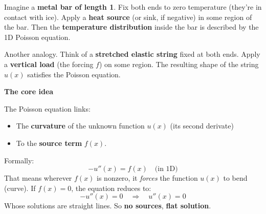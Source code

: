 \highspace
\begin{examplebox}
    Imagine a \textbf{metal bar of length 1}. Fix both ends to zero temperature (they're in contact with ice). Apply a \textbf{heat source} (or sink, if negative) in some region of the bar. Then the \textbf{temperature distribution} inside the bar is described by the 1D Poisson equation.

    Another analogy. Think of a \textbf{stretched elastic string} fixed at both ends. Apply a \textbf{vertical load} (the forcing $f$) on some region. The resulting shape of the string $u(x)$ satisfies the Poisson equation.
\end{examplebox}

\highspace
\begin{flushleft}
    \textcolor{Green3}{ \textbf{The core idea}}
\end{flushleft}
The Poisson equation links:
\begin{itemize}
    \item The \textbf{curvature} of the unknown function $u(x)$ (its second derivate)
    \item To the \textbf{source term} $f(x)$.
\end{itemize}
Formally:
\begin{equation*}
    - u''(x) = f(x) \quad \text{(in 1D)}
\end{equation*}
That means wherever $f(x)$ is nonzero, it \emph{forces} the function $u(x)$ to bend (curve). If $f(x) = 0$, the equation reduces to:
\begin{equation*}
    - u''(x) = 0 \quad \Longrightarrow \quad u''(x)=0
\end{equation*}
Whose solutions are straight lines. So \textbf{no sources}, \textbf{flat solution}.

